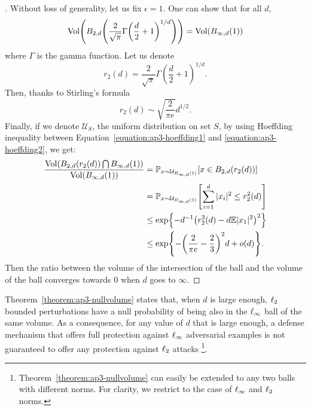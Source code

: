 \begin{proof}[] 
Without loss of generality, let us fix $\epsilon = 1$. One can show that for all $d$, 
\begin{equation}
    \Vol\left( B_{2,d}\left(\frac{2}{\sqrt{\pi}}\Gamma\left(\frac{d}{2}+1\right)^{1/d}\right)\right) = \Vol\left(B_{\infty,d}\left(1\right)\right)
\end{equation}
where $\Gamma$ is the gamma function. Let us denote 
\begin{equation}
    r_2(d)=\frac{2}{\sqrt{\pi}}\Gamma\left(\frac{d}{2}+1\right)^{1/d}.
\end{equation}
Then, thanks to Stirling's formula
\begin{equation}
    r_2(d)\sim \sqrt{\frac{2}{\pi e}} d^{1/2}.
\end{equation}
Finally, if we denote $\mathcal{U}_S$, the uniform distribution on set $S$, by using  Hoeffding inequality between Equation~\ref{equation:ap3-hoeffding1} and \ref{equation:ap3-hoeffding2}, we get:
\begin{align}
  \frac{\Vol(B_{2,d}(r_2(d)) \bigcap B_{\infty,d}(1))}{\Vol(B_{\infty,d}(1))} &= \Pbb_{x \sim \mathcal{U}_{B_{\infty,d}(1)}} \left[ x \in B_{2,d}(r_2(d)) \right] \\
  &= \Pbb_{x \sim \mathcal{U}_{B_{\infty,d}(1)}} \left[ \sum_{i=1}^d |x_i|^2 \leq r_2^2(d) \right] \\
  &\leq \exp{- d^{-1} \left( r_2^2(d) - d \Ebb |x_1|^2 \right)^2} \label{equation:ap3-hoeffding1} \\
  &\leq \exp{-\left( \frac{2}{\pi e}-\frac23\right)^2d+o(d)} \label{equation:ap3-hoeffding2}.
\end{align}
Then the ratio between the volume of the intersection of the ball and the volume of the ball converges towards $0$ when $d$ goes to $\infty$.
\end{proof}

Theorem~\ref{theorem:ap3-nullvolume} states that, when $d$ is large enough, $\ell_2 $ bounded perturbations have a null probability of being also in the $\ell_\infty $ ball of the same volume.
As a consequence, for any value of $d$ that is large enough, a defense mechanism that offers full protection against $\ell_\infty $ adversarial examples is not guaranteed to offer any protection against $\ell_2 $ attacks \footnote{Theorem~\ref{theorem:ap3-nullvolume} can easily be extended to any two balls with different norms. For clarity, we restrict to the case of $\ell_\infty $ and $\ell_2 $ norms.}.

